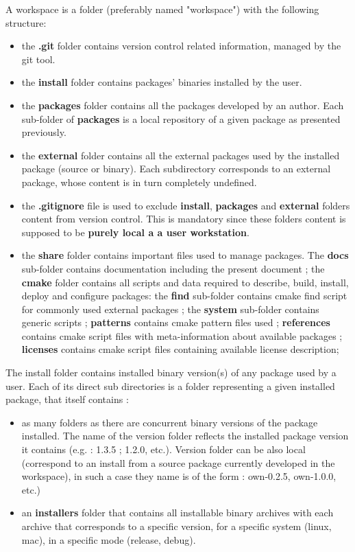 \documentclass[12pt,a4paper]{article}
\begin{document}
A workspace is a folder (preferably named "workspace") with the following structure:
\begin{itemize}
\item the \textbf{.git} folder contains version control related information, managed by the git tool.

\item the \textbf{install} folder contains packages' binaries installed by the user. 
\item the \textbf{packages} folder contains all the packages developed by an author. Each sub-folder of \textbf{packages} is a local repository of a given package as presented previously.
\item the \textbf{external} folder contains all the external packages used by the installed package (source or binary). Each subdirectory corresponds to an external package, whose content is in turn completely undefined.
\item the \textbf{.gitignore} file is used to exclude  \textbf{install}, \textbf{packages} and \textbf{external} folders content from version control. This is mandatory since these folders content is supposed to be \textbf{ purely local a a user workstation}.
\item the \textbf{share} folder contains important files used to manage packages. The \textbf{docs} sub-folder contains documentation including the present document ; the \textbf{cmake} folder contains all scripts and data required to describe, build, install, deploy and configure packages: the \textbf{find} sub-folder contains cmake find script for commonly used external packages ; the \textbf{system} sub-folder contains generic scripts ; \textbf{patterns} contains cmake pattern files used ; \textbf{references} contains cmake script files with meta-information about available packages ; \textbf{licenses} contains cmake script files containing available license description; 
\end{itemize}


The install folder contains installed binary version(s) of any package used by a user. Each of its direct sub directories is a folder representing a given installed package, that itself contains :
\begin{itemize}
\item as many folders as there are concurrent binary versions of the package installed. The name of the version folder reflects the installed package version it contains (e.g. : 1.3.5 ; 1.2.0, etc.). Version folder can be also local (correspond to an install from a source package currently developed in the workspace), in such a case they name is of the form : own-0.2.5, own-1.0.0, etc.)
\item an \textbf{installers} folder that contains all installable binary archives with each archive that corresponds to a specific version, for a specific system (linux, mac), in a specific mode (release, debug).
\end{itemize}
\end{document}
